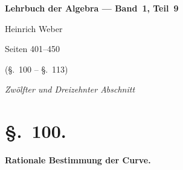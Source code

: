 \documentclass[12pt,a4paper]{article}
\theoremstyle{plain}
\begin{document}
\begin{titlepage}
\centering
\vspace*{3cm}
{\LARGE\bfseries Lehrbuch der Algebra --- Band~1, Teil~9\par}
\vspace{1cm}
{\Large Heinrich Weber\par}
\vspace{2cm}
{\large Seiten 401--450\par}
\vspace{0.5cm}
{\large (\S.~100 -- \S.~113)\par}
\vspace{2cm}
{\normalsize\itshape Zwölfter und Dreizehnter Abschnitt\par}
\end{titlepage}

\newpage
\setcounter{page}{401}

\section*{\S.~100.}
\begin{center}
\large\bfseries Rationale Bestimmung der Curve.
\end{center}
\vspace{0.5em}
\end{document}
